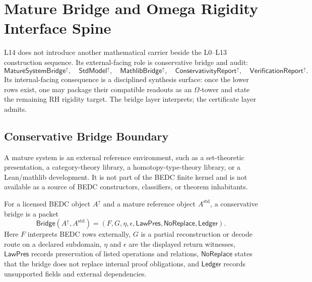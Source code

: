 \chapter{Mature Bridge and Omega Rigidity Interface Spine}
\label{ch:visions-mature-bridge-omega-rigidity-spine}

L14 does not introduce another mathematical carrier beside the L0--L13
construction sequence.  Its external-facing role is conservative bridge and
audit:
$$
\mathsf{MatureSystemBridge}^{\uparrow},\quad
\mathsf{StdModel}^{\uparrow},\quad
\mathsf{MathlibBridge}^{\uparrow},\quad
\mathsf{ConservativityReport}^{\uparrow},\quad
\mathsf{VerificationReport}^{\uparrow}.
$$
Its internal-facing consequence is a disciplined synthesis surface: once the
lower rows exist, one may package their compatible readouts as an
$\Omega$-tower and state the remaining RH rigidity target.  The bridge layer
interprets; the certificate layer admits.

\section{Conservative Bridge Boundary}
\label{sec:mature-bridge-spine-boundary}

\begin{definition}
\label{def:mature-bridge-spine-mature-system}
A mature system is an external reference environment, such as a set-theoretic
presentation, a category-theory library, a homotopy-type-theory library, or a
Lean/mathlib development.  It is not part of the BEDC finite kernel and is not
available as a source of BEDC constructors, classifiers, or theorem
inhabitants.
\end{definition}

\begin{definition}
\label{def:mature-bridge-spine-conservative-bridge}
For a licensed BEDC object $A^{\uparrow}$ and a mature reference object
$A^{\mathrm{std}}$, a conservative bridge is a packet
$$
\mathsf{Bridge}(A^{\uparrow},A^{\mathrm{std}})
=
(F,G,\eta,\epsilon,\mathsf{LawPres},\mathsf{NoReplace},\mathsf{Ledger}).
$$
Here $F$ interprets BEDC rows externally, $G$ is a partial reconstruction or
decode route on a declared subdomain, $\eta$ and $\epsilon$ are the displayed
return witnesses, $\mathsf{LawPres}$ records preservation of listed
operations and relations, $\mathsf{NoReplace}$ states that the bridge does not
replace internal proof obligations, and $\mathsf{Ledger}$ records unsupported
fields and external dependencies.
\end{definition}

